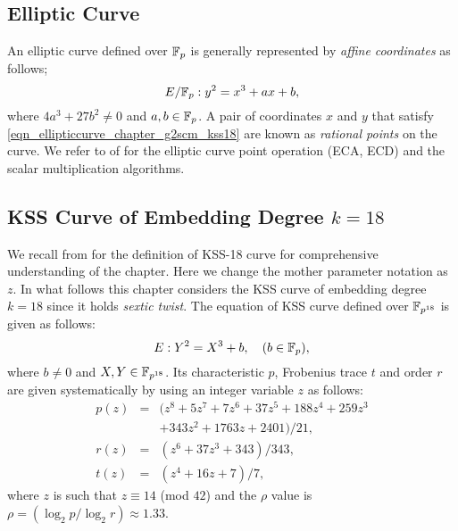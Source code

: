 \subsection{Elliptic Curve}
An elliptic curve \cite{washington2003elliptic} defined over ${\mathbb{F}}_{p}$ is generally represented by \textit{affine coordinates} \cite{Silverman} as follows;
\begin{equation}\label{eqn_ellipticcurve_chapter_g2scm_kss18}
E/{\mathbb{F}}_{p} : y^2=x^3+ax+b,
\end{equation}
where $ 4a^3+27b^2 \neq 0$ and $a,b \in {\mathbb{F}}_{p}$. A pair of coordinates $x$ and $y$ that satisfy \eqref{eqn_ellipticcurve_chapter_g2scm_kss18} are known as \textit{rational points} on the curve. 
We refer to  of  for the elliptic curve point operation (ECA, ECD) and the scalar multiplication algorithms.


\subsection{KSS Curve of Embedding Degree \texorpdfstring{$k=18$}{\textit{k=18}}}
We recall  from  for the definition of KSS-18 curve for comprehensive understanding of the chapter.
Here we change the mother parameter notation as $z$.
In what follows this chapter considers the KSS curve of embedding degree $k=18$ since it holds \textit{sextic twist}. 
The equation of KSS curve defined over $\mathbb{F}_{p^{18}}$ is given as follows:
\begin{equation}\label{eqn_kss18curve_chapter_g2scm_kss18}
E:Y^2=X^3+b, \quad \mbox{($b \in {\mathbb{F}}_{p}$)},
\end{equation}
where $b \neq 0$ and $X,Y \in \mathbb{F}_{p^{18}}$. Its characteristic $p$, Frobenius trace $t$ and order $r$ are given systematically by using an integer variable $z$ as follows:
\begin{subequations}
	\begin{eqnarray}
	p(z) &= & (z^8 +5z^7 +7z^6 +37z^5 +188z^4 +259z^3  \nonumber \\
	& & + 343z^2 +1763z+2401)/21,\\\label{eq:kss_char_chapter_g2scm_kss18}
	r(z) &= &(z^6 + 37z^3 + 343)/343,\label{eq:kss_degree_chapter_g2scm_kss18}  \\
	t(z) &=& (z^4 + 16z + 7)/7, \label{eq:kss_trace_chapter_g2scm_kss18} 
	\end{eqnarray}
\end{subequations} 
where $z$ is such that $z \equiv 14$ (mod $42$) and the $\rho$ value is $\rho = (\log_2 p/\log_2 r) \approx 1.33$.

